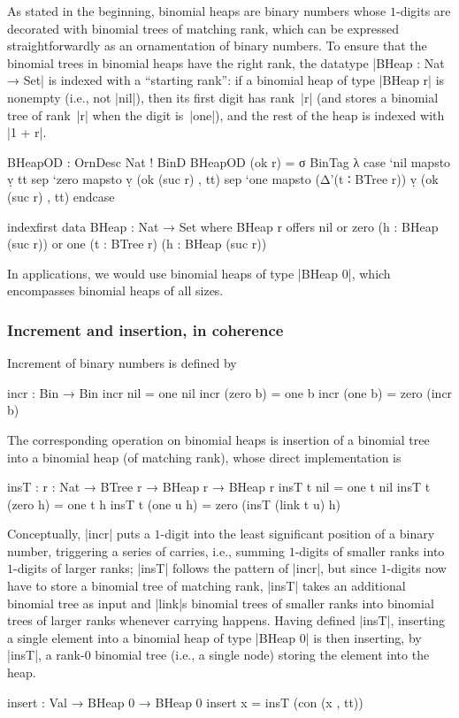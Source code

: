 As stated in the beginning, binomial heaps are binary numbers whose $1$-digits are decorated with binomial trees of matching rank, which can be expressed straightforwardly as an ornamentation of binary numbers.
To ensure that the binomial trees in binomial heaps have the right rank, the datatype |BHeap : Nat → Set| is indexed with a ``starting rank'': if a binomial heap of type |BHeap r| is nonempty (i.e., not |nil|), then its first digit has rank~|r| (and stores a binomial tree of rank~|r| when the digit is~|one|), and the rest of the heap is indexed with |1 + r|.
\begin{code}
BHeapOD : OrnDesc Nat ! BinD
BHeapOD (ok r) = σ BinTag λ  case  `nil   mapsto  ṿ tt
                             sep   `zero  mapsto  ṿ (ok (suc r) , tt)
                             sep   `one   mapsto  (Δ'(t ∶ BTree r)) ṿ (ok (suc r) , tt) endcase

indexfirst data BHeap : Nat → Set where
  BHeap r  offers  nil
           or      zero  (h : BHeap (suc r))
           or      one   (t : BTree r) (h : BHeap (suc r))
\end{code}
In applications, we would use binomial heaps of type |BHeap 0|, which encompasses binomial heaps of all sizes.

\subsubsection{Increment and insertion, in coherence}
Increment of binary numbers is defined by
\begin{code}
incr : Bin → Bin
incr nil        =  one nil
incr (zero  b)  =  one b
incr (one   b)  =  zero (incr b)
\end{code}
The corresponding operation on binomial heaps is insertion of a binomial tree into a binomial heap (of matching rank), whose direct implementation is
\begin{code}
insT : {r : Nat} → BTree r → BHeap r → BHeap r
insT t nil         = one t nil
insT t (zero   h)  = one t h
insT t (one u  h)  = zero (insT (link t u) h)
\end{code}
Conceptually, |incr| puts a $1$-digit into the least significant position of a binary number, triggering a series of carries, i.e., summing $1$-digits of smaller ranks into $1$-digits of larger ranks; |insT| follows the pattern of |incr|, but since $1$-digits now have to store a binomial tree of matching rank, |insT| takes an additional binomial tree as input and |link|s binomial trees of smaller ranks into binomial trees of larger ranks whenever carrying happens.
Having defined |insT|, inserting a single element into a binomial heap of type |BHeap 0| is then inserting, by |insT|, a rank-$0$ binomial tree (i.e., a single node) storing the element into the heap.
\begin{code}
insert : Val → BHeap 0 → BHeap 0
insert x = insT (con (x , tt))
\end{code}

